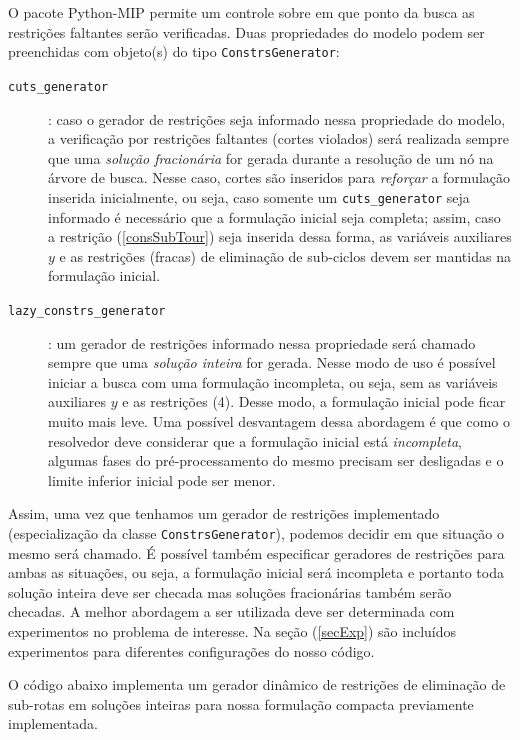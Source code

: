 \documentclass[a4paper,11pt,fleqn]{article}
\begin{document}
O pacote Python-MIP permite um controle sobre em que ponto da busca as restrições faltantes serão verificadas. Duas propriedades do modelo podem ser preenchidas com objeto(s) do tipo \texttt{ConstrsGenerator}:

\begin{description}
	\item[\texttt{cuts\_generator}]: caso o gerador de restrições seja informado nessa propriedade do modelo, a verificação por restrições faltantes (cortes violados) será realizada sempre que uma \emph{solução fracionária} for gerada durante a resolução de um nó na árvore de busca. Nesse caso, cortes são inseridos para \emph{reforçar} a formulação inserida inicialmente, ou seja, caso somente um \texttt{cuts\_generator} seja informado é necessário que a formulação inicial seja completa; assim, caso a restrição (\ref{consSubTour}) seja inserida dessa forma, as variáveis auxiliares $y$ e as restrições (fracas) de eliminação de sub-ciclos devem ser mantidas na formulação inicial.
	
	\item[\texttt{lazy\_constrs\_generator}]: um gerador de restrições informado nessa propriedade será chamado sempre que uma \emph{solução inteira} for gerada. Nesse modo de uso é possível iniciar a busca com uma formulação incompleta, ou seja, sem as variáveis auxiliares $y$ e as restrições (4). Desse modo, a formulação inicial pode ficar muito mais leve. Uma possível desvantagem dessa abordagem é que como o resolvedor deve considerar que a formulação inicial está \emph{incompleta}, algumas fases do pré-processamento do mesmo precisam ser desligadas e o limite inferior inicial pode ser menor.
\end{description}

Assim, uma vez que tenhamos um gerador de restrições implementado (especialização da classe \texttt{ConstrsGenerator}), podemos decidir em que situação o mesmo será chamado. É possível também especificar geradores de restrições para ambas as situações, ou seja, a formulação inicial será incompleta e portanto toda solução inteira deve ser checada mas soluções fracionárias também serão checadas. A melhor abordagem a ser utilizada deve ser determinada com experimentos no problema de interesse. Na seção (\ref{secExp}) são incluídos experimentos para diferentes configurações do nosso código.

O código abaixo implementa um gerador dinâmico de restrições de eliminação de sub-rotas em soluções inteiras para nossa formulação compacta previamente implementada. 
\end{document}
